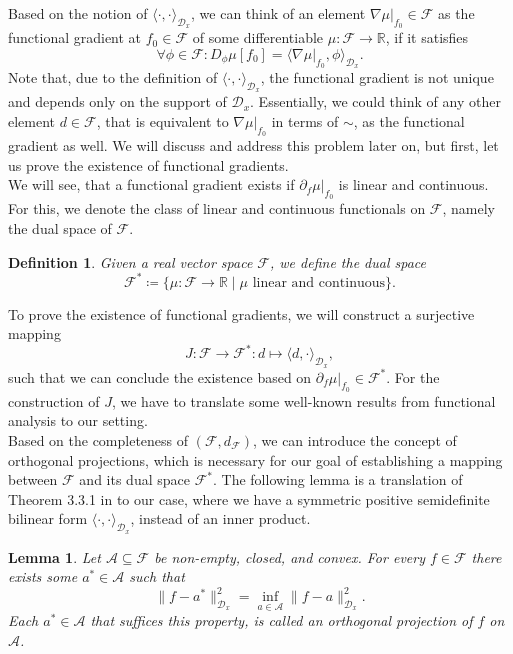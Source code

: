 \documentclass[11pt, a4paper]{article}
\newtheorem{lemma}[theorem]{Lemma}
\newtheorem{definition}[theorem]{Definition}
\newcommand{\R}{\mathbb{R}}
\newcommand{\A}{\mathcal{A}}
\newcommand{\D}{\mathcal{D}}
\newcommand{\F}{\mathcal{F}}
\begin{document}
Based on the notion of $\langle \cdot, \cdot \rangle_{\D_x}$, we can think of an element $\nabla \mu |_{f_0} \in \F$ as the functional gradient at $f_0 \in \F$ of some differentiable $\mu : \F \to \R$, if it satisfies
\[ \forall \phi \in \F : D_\phi\mu[f_0] = \big \langle \nabla \mu |_{f_0}, \phi \big \rangle_{\D_x}. \]
Note that, due to the definition of $\langle \cdot, \cdot \rangle_{\D_x}$, the functional gradient is not unique and depends only on the support of $\D_x$. Essentially, we could think of any other element $d \in \F$, that is equivalent to $\nabla \mu |_{f_0}$ in terms of $\sim$, as the functional gradient as well. We will discuss and address this problem later on, but first, let us prove the existence of functional gradients. \\

We will see, that a functional gradient exists if $\partial_f \mu |_{f_0}$ is linear and continuous. For this, we denote the class of linear and continuous functionals on $\F$, namely the dual space of $\F$.

\begin{definition}
Given a real vector space $\F$, we define the dual space
\[ \F^* \coloneq \Big \{ \mu : \F \to \R \mid \mu \text{ linear and continuous} \Big \}. \]
\end{definition}

To prove the existence of functional gradients, we will construct a surjective mapping 
\[ J: \F \to \F^* : d \mapsto \langle d, \cdot \rangle_{\D_x}, \]
such that we can conclude the existence based on $\partial_f \mu |_{f_0} \in \F^*$. For the construction of $J$, we have to translate some well-known results from functional analysis to our setting. \\

Based on the completeness of $(\F, d_\F)$, we can introduce the concept of orthogonal projections, which is necessary for our goal of establishing a mapping between $\F$ and its dual space $\F^*$. The following lemma is a translation of Theorem 3.3.1 in \cite{FunctionalAnalysis} to our case, where we have a symmetric positive semidefinite bilinear form $\langle \cdot, \cdot \rangle_{\D_x}$, instead of an inner product.

\begin{lemma} \label{lem:projection}
Let $\A \subseteq \F$ be non-empty, closed, and convex. For every $f \in \F$ there exists some $a^* \in \A$ such that 
\[ \big \| f - a^* \big \|_{\D_x}^2 = \inf_{a \in \A} \big \| f - a \big \|_{\D_x}^2. \]
Each $a^* \in \A$ that suffices this property, is called an orthogonal projection of $f$ on $\A$.
\end{lemma}
\end{document}
